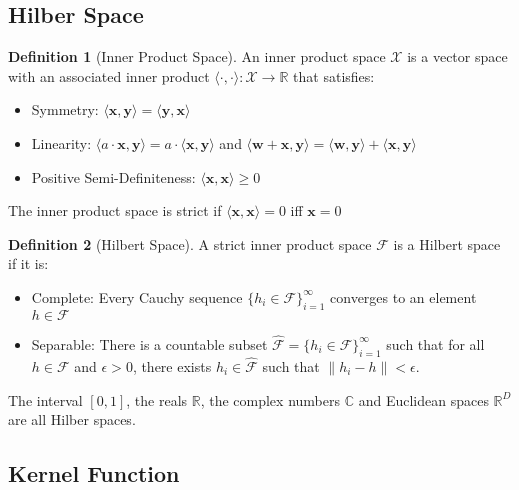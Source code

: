 \documentclass[12pt]{article}
\theoremstyle{definition}
\newtheorem{definition}{Definition}[section]
\theoremstyle{remark}
\begin{document}
\subsection{Hilber Space}
\begin{definition}[Inner Product Space]
  An inner product space \(\mathcal{X}\) is a vector space with an associated inner product \(\langle \cdot,\cdot \rangle: \mathcal{X} \rightarrow \mathbb{R}\) that satisfies:
  \begin{itemize}
    \item Symmetry: \(\langle \mathbf{x}, \mathbf{y} \rangle = \langle \mathbf{y}, \mathbf{x} \rangle\)
    \item Linearity: \(\langle a \cdot \mathbf{x}, \mathbf{y} \rangle = a \cdot \langle \mathbf{x}, \mathbf{y} \rangle\) and \(\langle \mathbf{w} + \mathbf{x}, \mathbf{y} \rangle =  \langle \mathbf{w}, \mathbf{y} \rangle + \langle \mathbf{x}, \mathbf{y} \rangle\)
    \item Positive Semi-Definiteness: \( \langle \mathbf{x}, \mathbf{x} \rangle \geq 0 \)
  \end{itemize}
  The inner product space is strict if \( \langle \mathbf{x}, \mathbf{x} \rangle = 0 \) iff \( \mathbf{x} = 0 \)
\end{definition}

\begin{definition}[Hilbert Space]
  A strict inner product space \(\mathcal{F}\) is a Hilbert space if it is:
  \begin{itemize}
    \item Complete: Every Cauchy sequence \(\{ h_i \in \mathcal{F} \}_{i=1}^\infty\) converges to an element \(h \in \mathcal{F}\)
    \item Separable: There is a countable subset \( \mathcal{\hat{F}} = \{ h_i \in \mathcal{F} \}_{i=1}^\infty \) such that for all \(h \in \mathcal{F}\) and \(\epsilon > 0 \), there exists \(h_i \in \mathcal{\hat{F}}\) such that \(\| h_i - h\| < \epsilon\).
  \end{itemize}
\end{definition}

The interval \([0, 1]\), the reals \(\mathbb{R}\), the complex numbers \(\mathbb{C}\) and Euclidean spaces \(\mathbb{R}^D\) are all Hilber spaces.

\subsection{Kernel Function}
\end{document}
